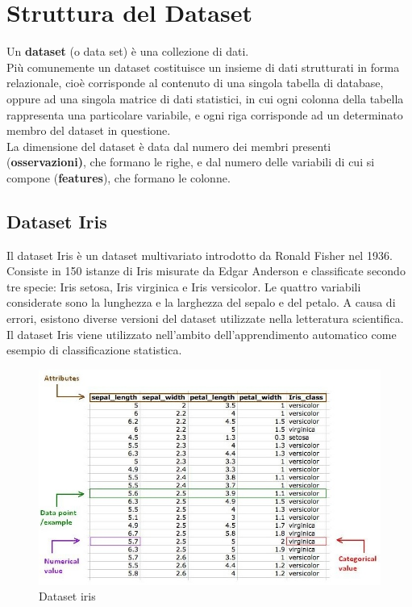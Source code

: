 \documentclass[a4paper, oneside]{book}
\begin{document}
\newpage
\large
\section*{Struttura del Dataset}
Un \textbf{dataset} (o data set) è una collezione di dati.\\
Più comunemente un dataset costituisce un insieme di dati strutturati in forma relazionale, cioè corrisponde al contenuto di una singola tabella di database, oppure ad una singola matrice di dati statistici, in cui ogni colonna della tabella rappresenta una particolare variabile, e ogni riga corrisponde ad un determinato membro del dataset in questione.\\
La dimensione del dataset è data dal numero dei membri presenti (\textbf{osservazioni)}, che formano le righe, e dal numero delle variabili di cui si compone (\textbf{features}), che formano le colonne.
\\
\large
\subsection*{Dataset Iris}
Il dataset Iris è un dataset multivariato introdotto da Ronald Fisher nel 1936. Consiste in 150 istanze di Iris misurate da Edgar Anderson e classificate secondo tre specie: Iris setosa, Iris virginica e Iris versicolor. Le quattro variabili considerate sono la lunghezza e la larghezza del sepalo e del petalo. A causa di errori, esistono diverse versioni del dataset utilizzate nella letteratura scientifica.
Il dataset Iris viene utilizzato nell'ambito dell'apprendimento automatico come esempio di classificazione statistica.
\begin{figure}[htp]
\centering
\includegraphics[width=13cm]{datasetIris.jpg}
\caption{Dataset iris}
\label{fig:iris}
\end{figure}
\\
\newpage
\large
\end{document}
